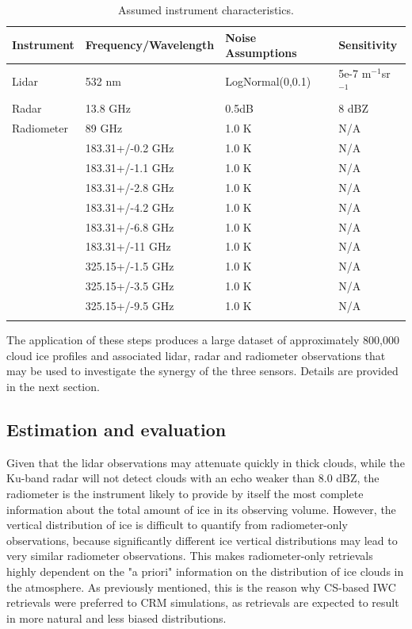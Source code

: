 \documentclass{ametsocV6.1}
\begin{document}
\begin{table}
    \caption{Assumed instrument characteristics.}\label{t_sensors}
    \begin{center}
    \begin{tabular}{llll}

    Instrument & Frequency/Wavelength & Noise Assumptions& Sensitivity \\
    \hline
    Lidar & 532 nm & LogNormal(0,0.1) & 5e-7 m$^{-1}$sr$^{-1}$ \\
    \hline
    Radar & 13.8 GHz & 0.5dB & 8 dBZ \\
    \hline
    Radiometer & 89 GHz & 1.0 K & N/A \\
    & 183.31+/-0.2 GHz & 1.0 K & N/A \\
    & 183.31+/-1.1 GHz & 1.0 K & N/A \\
    & 183.31+/-2.8 GHz & 1.0 K & N/A \\
    & 183.31+/-4.2 GHz & 1.0 K & N/A \\
    & 183.31+/-6.8 GHz & 1.0 K & N/A \\
    & 183.31+/-11 GHz & 1.0 K & N/A \\
    & 325.15+/-1.5 GHz & 1.0 K & N/A \\
    & 325.15+/-3.5 GHz & 1.0 K & N/A \\
    & 325.15+/-9.5 GHz & 1.0 K & N/A \\
   \hline \\
    
    \end{tabular}
\end{center}
\end{table}


The application of these steps produces a large dataset of approximately 800,000 cloud ice profiles and associated lidar, radar and radiometer observations that may be used to investigate the synergy of the three sensors. Details are provided in the next section.

\subsection{Estimation and evaluation}
Given that the lidar observations may attenuate quickly in thick clouds, while the Ku-band radar will not detect clouds with an echo weaker than 8.0 dBZ, the radiometer is the instrument likely to provide by itself the most complete information about the total amount of ice in its observing volume.  However, the vertical distribution of ice is difficult to quantify from radiometer-only observations, because significantly different ice vertical distributions may lead to very similar radiometer observations.  This makes radiometer-only retrievals highly dependent on the "a priori" information on the distribution of ice clouds in the atmosphere. As previously mentioned, this is the reason why CS-based IWC retrievals were preferred to CRM simulations, as retrievals are expected to result in more natural and less biased distributions. 
\end{document}
